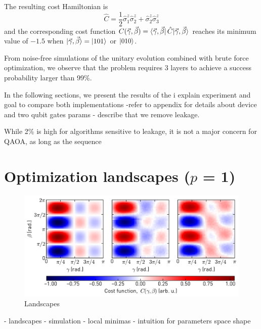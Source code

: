 The resulting cost Hamiltonian is
\begin{equation}
    \hat C = \frac{1}{2}\hat\sigma_1^z\hat\sigma_2^z + \hat\sigma_2^z\hat\sigma_3^z
\end{equation}
and the corresponding cost function $C(\vec\gamma, \vec\beta) = \bra{\vec\gamma, \vec\beta} \hat C |\vec{\gamma}, \vec{\beta}\rangle{}$ reaches its minimum value of $-1.5$ when $|\vec{\gamma}, \vec{\beta}\rangle{} = \ket{101}$ or $\ket{010}$. 

From noise-free simulations of the unitary evolution combined with brute force optimization, we observe that the problem requires 3 layers to achieve a success probability larger than 99\%.

In the following sections, we present the results of the i
explain experiment and goal to compare both implementations
-refer to appendix for details about device and two qubit gates params
- describe that we remove leakage.

While 2\% is high for algorithms sensitive to leakage, it is not a major concern for QAOA, as long as the sequence

\section{Optimization landscapes ($p$ = 1)}
\begin{figure}[ht]
    \centering
    \includegraphics[width=\textwidth]{chapters/qaoa/figs/qaoa_landscapes_20200129_125251.png}
    \caption{Landscapes}
    \label{fig:qaoa_landscapes}
\end{figure}
- landscapes
- simulation
- local minimas
- intuition for parameters space shape

